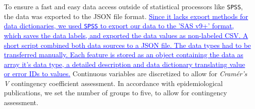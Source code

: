 \documentclass[journal]{style/vgtc} 			          %
\newcommand{\add}[1]{\textcolor{blue}{\uline{#1}}}
\begin{document}
To ensure a fast and easy data access outside of statistical processors like \texttt{SPSS}, the data was exported to the JSON file format.
%
\add{
Since it lacks export methods for data dictionaries, we used \texttt{SPSS} to export our data to the 'SAS v9+' format, which saves the data labels, and exported the data values as non-labeled CSV.
%
A short script combined both data sources to a JSON file.
%
The data types had to be transferred manually.
}
%
\add{Each feature is stored as an object containing the data as array it's data type, a detailed description and data dictionary translating value or error IDs to values.}
%
Continuous variables are discretized to allow for \emph{Cram\'{e}r's V} contingency coefficient assessment.
%
In accordance with epidemiological publications, we set the number of groups to five, to allow for contingency assessment.
\end{document}
